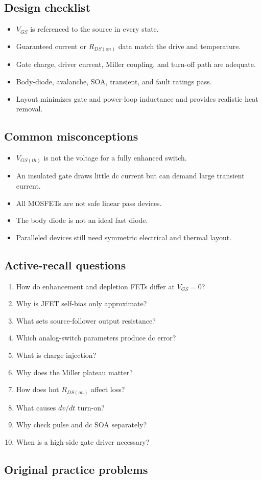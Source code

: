 \documentclass[10pt,letterpaper]{article}
\begin{document}
\subsection{Design checklist}
\begin{itemize}
  \item $V_{GS}$ is referenced to the source in every state.
  \item Guaranteed current or $R_{DS(on)}$ data match the drive and temperature.
  \item Gate charge, driver current, Miller coupling, and turn-off path are adequate.
  \item Body-diode, avalanche, SOA, transient, and fault ratings pass.
  \item Layout minimizes gate and power-loop inductance and provides realistic heat removal.
\end{itemize}\subsection{Common misconceptions}
\begin{itemize}
  \item $V_{GS(th)}$ is not the voltage for a fully enhanced switch.
  \item An insulated gate draws little dc current but can demand large transient current.
  \item All MOSFETs are not safe linear pass devices.
  \item The body diode is not an ideal fast diode.
  \item Paralleled devices still need symmetric electrical and thermal layout.
\end{itemize}\subsection{Active-recall questions}
\begin{enumerate}
  \item How do enhancement and depletion FETs differ at $V_{GS}=0$?
  \item Why is JFET self-bias only approximate?
  \item What sets source-follower output resistance?
  \item Which analog-switch parameters produce dc error?
  \item What is charge injection?
  \item Why does the Miller plateau matter?
  \item How does hot $R_{DS(on)}$ affect loss?
  \item What causes $dv/dt$ turn-on?
  \item Why check pulse and dc SOA separately?
  \item When is a high-side gate driver necessary?
\end{enumerate}\subsection{Original practice problems}
\end{document}
